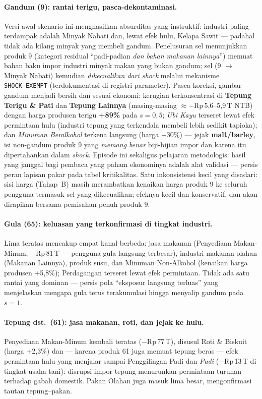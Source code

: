 \documentclass[11pt,a4paper]{article}
\newcommand{\en}[1]{\textit{#1}}   %
\begin{document}
\paragraph{Gandum (9): rantai terigu, pasca-dekontaminasi.} Versi awal
skenario ini menghasilkan absurditas yang instruktif: industri paling
terdampak adalah Minyak Nabati dan, lewat efek hulu, Kelapa Sawit ---
padahal tidak ada kilang minyak yang membeli gandum. Penelusuran sel
menunjukkan produk 9 (kategori residual ``padi-padian \emph{dan bahan
makanan lainnya}'') memuat bahan baku impor industri minyak makan yang
bukan gandum; sel (9 $\to$ Minyak Nabati) kemudian \emph{dikecualikan
dari \en{shock}} melalui mekanisme \texttt{SHOCK\_EXEMPT} (terdokumentasi
di registri parameter). Pasca-koreksi, gambar gandum menjadi bersih dan
sesuai ekonomi: kerugian terkonsentrasi di \textbf{Tepung Terigu \& Pati}
dan \textbf{Tepung Lainnya} (masing-masing $\approx -$Rp\,5{,}6--5{,}9\,T
NTB) dengan harga produsen terigu \textbf{+89\%} pada $s = 0{,}5$;
\emph{Ubi Kayu} terseret lewat efek permintaan hulu (industri tepung yang
terkendala membeli lebih sedikit tapioka); dan \emph{Minuman Beralkohol}
terkena langsung (harga +30\%) --- jejak \textbf{malt/barley}, isi
non-gandum produk 9 yang \emph{memang benar} biji-bijian impor dan karena
itu dipertahankan dalam \en{shock}. Episode ini sekaligus pelajaran
metodologis: hasil yang janggal bagi pembaca yang paham ekonominya adalah
alat validasi --- persis peran lapisan pakar pada tabel kritikalitas.
Satu inkonsistensi kecil yang disadari: sisi harga (Tahap~B) masih
merambatkan kenaikan harga produk 9 ke seluruh pengguna termasuk sel yang
dikecualikan; efeknya kecil dan konservatif, dan akan dirapikan bersama
pemisahan penuh produk 9.

\paragraph{Gula (65): keluasan yang terkonfirmasi di tingkat industri.}
Lima teratas mencakup empat kanal berbeda: jasa makanan (Penyediaan
Makan-Minum, $-$Rp\,81\,T --- pengguna gula langsung terbesar), industri
makanan olahan (Makanan Lainnya), produk susu, dan Minuman Non-Alkohol
(kenaikan harga produsen +5{,}8\%); Perdagangan terseret lewat efek
permintaan. Tidak ada satu rantai yang dominan --- persis pola
``eksposur langsung terluas'' yang menjelaskan mengapa gula terus
terakumulasi hingga menyalip gandum pada $s = 1$.

\paragraph{Tepung dst.\ (61): jasa makanan, roti, dan jejak ke hulu.}
Penyediaan Makan-Minum kembali teratas ($-$Rp\,77\,T), disusul Roti \&
Biskuit (harga +2{,}3\%) dan --- karena produk 61 juga memuat tepung
beras --- efek permintaan hulu yang menjalar sampai Penggilingan Padi dan
\emph{Padi} ($-$Rp\,13\,T di tingkat usaha tani): disrupsi impor tepung
menurunkan permintaan turunan terhadap gabah domestik. Pakan Olahan juga
masuk lima besar, mengonfirmasi tautan tepung--pakan.
\end{document}
